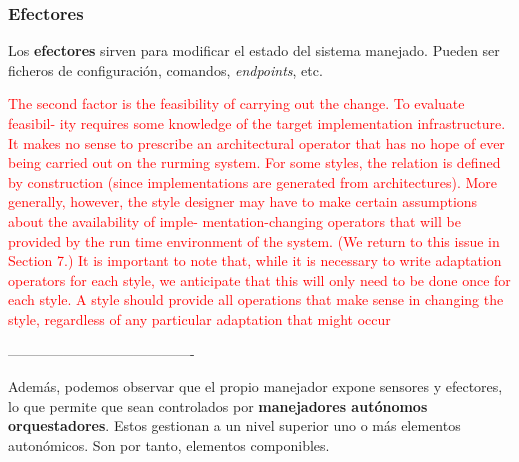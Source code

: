 \subsubsection{Efectores}

Los \textbf{efectores} sirven para modificar el estado del sistema manejado. Pueden ser ficheros de configuración, comandos, \emph{endpoints}, etc.

\textcolor{red}{The second factor is the feasibility of carrying out the change. To evaluate feasibil-
ity requires some knowledge of the target implementation infrastructure. It makes no
sense to prescribe an architectural operator that has no hope of ever being carried out
on the rurming system. For some styles, the relation is defined by construction (since
implementations are generated from architectures). More generally, however, the
style designer may have to make certain assumptions about the availability of imple-
mentation-changing operators that will be provided by the run time environment of
the system. (We return to this issue in Section 7.)
It is important to note that, while it is necessary to write adaptation operators for
each style, we anticipate that this will only need to be done once for each style. A
style should provide all operations that make sense in changing the style, regardless of
any particular adaptation that might occur\cite{garlanIncreasingSystemDependability2003}}


----------------------------------------

Además, podemos observar que el propio manejador expone sensores y efectores, lo que permite que sean controlados por \textbf{manejadores autónomos orquestadores}. Estos gestionan a un nivel superior uno o más elementos autonómicos. Son por tanto, elementos componibles.
